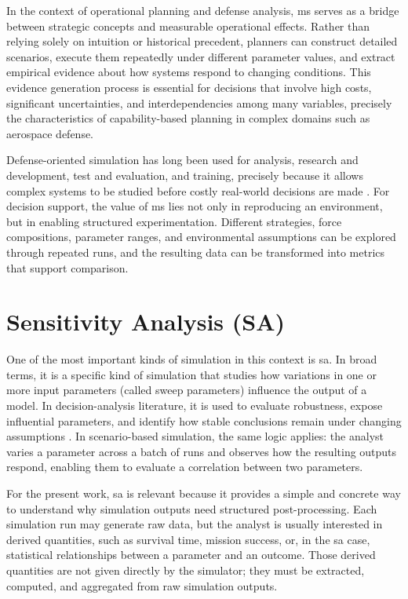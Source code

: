 In the context of operational planning and defense analysis, \gls{ms} serves as a bridge between strategic concepts and measurable operational effects. Rather than relying solely on intuition or historical precedent, planners can construct detailed scenarios, execute them repeatedly under different parameter values, and extract empirical evidence about how systems respond to changing conditions. This evidence generation process is essential for decisions that involve high costs, significant uncertainties, and interdependencies among many variables, precisely the characteristics of capability-based planning in complex domains such as aerospace defense.

Defense-oriented simulation has long been used for analysis, research and development, test and evaluation, and training, precisely because it allows complex systems to be studied before costly real-world decisions are made \parencite{hodson2014lvc}. For decision support, the value of \gls{ms} lies not only in reproducing an environment, but in enabling structured experimentation. Different strategies, force compositions, parameter ranges, and environmental assumptions can be explored through repeated runs, and the resulting data can be transformed into metrics that support comparison.

\section{Sensitivity Analysis (SA)}
\label{sec:cap2-sensitivity-analysis-sa}

One of the most important kinds of simulation in this context is \gls{sa}. In broad terms, it is a specific kind of simulation that studies how variations in one or more input parameters (called sweep parameters) influence the output of a model. In decision-analysis literature, it is used to evaluate robustness, expose influential parameters, and identify how stable conclusions remain under changing assumptions \parencite{wieckowski2023sensitivity}. In scenario-based simulation, the same logic applies: the analyst varies a parameter across a batch of runs and observes how the resulting outputs respond, enabling them to evaluate a correlation between two parameters.

For the present work, \gls{sa} is relevant because it provides a simple and concrete way to understand why simulation outputs need structured post-processing. Each simulation run may generate raw data, but the analyst is usually interested in derived quantities, such as survival time, mission success, or, in the \gls{sa} case, statistical relationships between a parameter and an outcome. Those derived quantities are not given directly by the simulator; they must be extracted, computed, and aggregated from raw simulation outputs.

